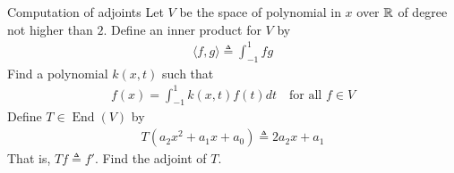 \documentclass{report}
\begin{document}
\begin{question}{Computation of adjoints}{}
Let $V$ be the space of polynomial in $x$ over  $\mathbb{R}$ of degree not higher than  $2$. Define an inner product for $V$ by 
\begin{align*}
\langle f,g\rangle \triangleq \int_{-1}^{1} fg
\end{align*}
Find a polynomial $k(x,t)$ such that 
\begin{align}
\label{fx=}
f(x)= \int_{-1}^{1}k(x,t)f(t)dt \quad\text{for all }f \in V
\end{align}
Define $T \in \operatorname{End}(V)$ by 
\begin{align*}
T(a_2x^2+a_1x+a_0) \triangleq 2a_2x+a_1
\end{align*}
That is, $Tf\triangleq f'$. Find the adjoint of $T$. 
\end{question}
\end{document}

